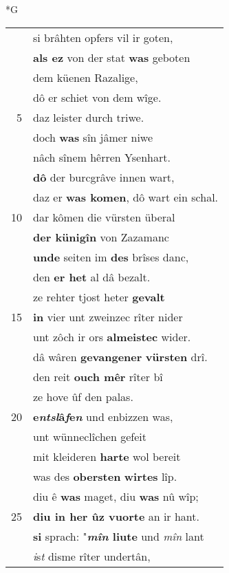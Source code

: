 \documentclass[8pt,a4paper,notitlepage]{article}
\begin{document}
\newpage
\begin{table}[ht]
\begin{minipage}[t]{0.5\linewidth}
\small
\begin{center}*G
\end{center}
\begin{tabular}{rl}
 & si brâhten opfers vil ir goten,\\ 
 & \textbf{als ez} von der stat \textbf{was} geboten\\ 
 & dem küenen Razalige,\\ 
 & dô er schiet von dem wîge.\\ 
5 & daz leister durch triwe.\\ 
 & doch \textbf{was} sîn jâmer niwe\\ 
 & nâch sînem hêrren Ysenhart.\\ 
 & \textbf{dô} der burcgrâve innen wart,\\ 
 & daz er \textbf{was komen}, dô wart ein schal.\\ 
10 & dar kômen die vürsten überal\\ 
 & \textbf{der künigîn} von Zazamanc\\ 
 & \textbf{unde} seiten im \textbf{des} brîses danc,\\ 
 & den \textbf{er het} al dâ bezalt.\\ 
 & ze rehter tjost heter \textbf{gevalt}\\ 
15 & \textbf{in} vier unt zweinzec rîter nider\\ 
 & unt zôch ir ors \textbf{almeistec} wider.\\ 
 & dâ wâren \textbf{gevangener} \textbf{vürsten} drî.\\ 
 & den reit \textbf{ouch mêr} rîter bî\\ 
 & ze hove ûf den palas.\\ 
20 & \textbf{e\textit{ntsl}â\textit{f}e\textit{n}} und enbizzen was,\\ 
 & unt wünneclîchen gefeit\\ 
 & mit kleideren \textbf{harte} wol bereit\\ 
 & was des \textbf{obersten} \textbf{wirtes} lîp.\\ 
 & diu ê \textbf{was} maget, diu \textbf{was} nû wîp;\\ 
25 & \textbf{diu in her ûz vuorte} an ir hant.\\ 
 & \textbf{si} sprach: "\textbf{\textit{mîn} liute} und \textit{mîn} lant\\ 
 & \textit{i}s\textit{t} disme rîter undertân,\\ 

\end{tabular}
\end{minipage}
\end{table}
\end{document}
